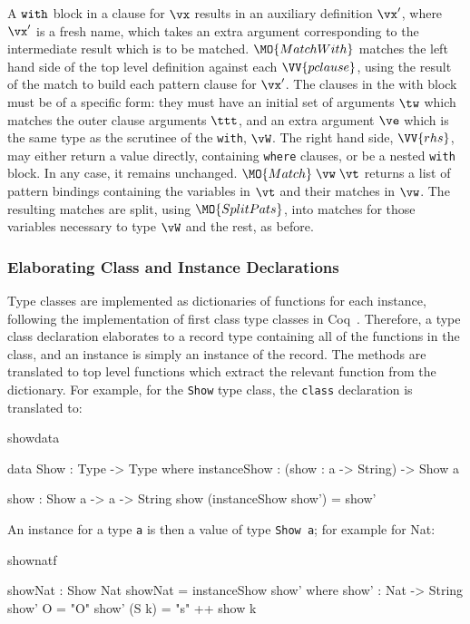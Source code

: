 A $\mathtt{with}$ block in a clause for $\vx$
results in an auxiliary definition $\vx'$, where $\vx'$ is a fresh name,
which takes an extra argument corresponding to the intermediate result which
is to be matched.
$\MO{MatchWith}$ matches the left hand side of the top level definition against
each $\VV{pclause}$, using the result of the match to build each pattern clause
for $\vx'$. 
The clauses in the with block must be of a specific form: they must have an initial
set of arguments $\tw$ which matches the outer clause arguments
$\ttt$, and an extra argument
$\ve$ which is the same type as the scrutinee of the \texttt{with}, $\vW$.
The right hand side, $\VV{rhs}$, may either return a value directly, containing 
\texttt{where} clauses, or be a nested \texttt{with} block. In any case, it
remains unchanged.
$\MO{Match}\;\vw\;\vt$ returns a list of pattern bindings containing
the variables in $\vt$ and their matches in $\vw$.
The resulting matches are split, using $\MO{SplitPats}$, into matches for those
variables necessary to type $\vW$ and the rest, as before.

\subsubsection{Elaborating Class and Instance Declarations}

Type classes are implemented as dictionaries of functions for each instance,
following the implementation of first class type classes in Coq~\cite{Sozeau2008}.
Therefore, a type class declaration elaborates to a record type containing all
of the functions in the class, and an instance is simply an instance of the
record. The methods are translated to top level functions which extract the
relevant function from the dictionary.  For example, for the \texttt{Show} type
class, the \texttt{class} declaration is translated to:

\begin{SaveVerbatim}{showdata}

data Show : Type -> Type where
    instanceShow : (show : a -> String) -> Show a

show : Show a -> a -> String
show (instanceShow show') = show'

\end{SaveVerbatim}

\noindent
An instance for a type \texttt{a} is then a value of type \texttt{Show a}; for example for Nat:

\begin{SaveVerbatim}{shownatf}

showNat : Show Nat
showNat = instanceShow show' where
    show' : Nat -> String
    show' O = "O"
    show' (S k) = "s" ++ show k

\end{SaveVerbatim}

